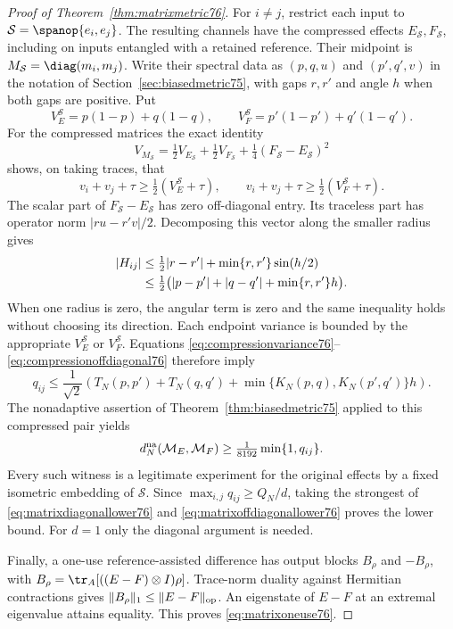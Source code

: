 \begin{proof}[Proof of Theorem~\ref{thm:matrixmetric76}]
For $i\ne j$, restrict each input to
$\mathcal S=\spanop\{e_i,e_j\}$.  The resulting channels have
the compressed effects $E_{\mathcal S},F_{\mathcal S}$, including
on inputs entangled with a retained reference.  Their midpoint is
$M_{\mathcal S}=\diag(m_i,m_j)$.  Write their spectral data as
$(p,q,u)$ and $(p',q',v)$ in the notation of
Section~\ref{sec:biasedmetric75}, with gaps $r,r'$ and angle $h$
when both gaps are positive.  Put
\[
 V_E^{\mathcal S}=p(1-p)+q(1-q),\qquad
 V_F^{\mathcal S}=p'(1-p')+q'(1-q').
\]
For the compressed matrices the exact identity
\[
 V_{M_{\mathcal S}}=\tfrac12V_{E_{\mathcal S}}
              +\tfrac12V_{F_{\mathcal S}}
              +\tfrac14(F_{\mathcal S}-E_{\mathcal S})^2
\]
shows, on taking traces, that
\begin{equation}\label{eq:compressionvariance76}
 v_i+v_j+\tau\ge\tfrac12(V_E^{\mathcal S}+\tau),
 \qquad
 v_i+v_j+\tau\ge\tfrac12(V_F^{\mathcal S}+\tau).
\end{equation}
The scalar part of $F_{\mathcal S}-E_{\mathcal S}$ has zero
off-diagonal entry.  Its traceless part has operator norm
$|ru-r'v|/2$.  Decomposing this vector along the smaller radius
gives
\begin{align}
 |H_{ij}|&\le\tfrac12|r-r'|+\min\{r,r'\}\sin(h/2)\notag\\
 &\le\tfrac12\bigl(|p-p'|+|q-q'|+\min\{r,r'\}h\bigr).
                                      \label{eq:compressionoffdiagonal76}
\end{align}
When one radius is zero, the angular term is zero and the same
inequality holds without choosing its direction.  Each endpoint
variance is bounded by the appropriate $V_E^{\mathcal S}$ or
$V_F^{\mathcal S}$.  Equations
\eqref{eq:compressionvariance76}--\eqref{eq:compressionoffdiagonal76}
therefore imply
\begin{equation}\label{eq:compressionmodulus76}
 q_{ij}\le\frac1{\sqrt2}
 \left(T_N(p,p')+T_N(q,q')
       +\min\{K_N(p,q),K_N(p',q')\}h\right).
\end{equation}
The nonadaptive assertion of Theorem~\ref{thm:biasedmetric75}
applied to this compressed pair yields
\begin{equation}\label{eq:matrixoffdiagonallower76}
 d_N^{\rm na}(\mathcal M_E,\mathcal M_F)
                         \ge\tfrac1{8192}\min\{1,q_{ij}\}.
\end{equation}
Every such witness is a legitimate experiment for the original
effects by a fixed isometric embedding of $\mathcal S$.
Since $\max_{i,j}q_{ij}\ge Q_N/d$, taking the strongest of
\eqref{eq:matrixdiagonallower76} and
\eqref{eq:matrixoffdiagonallower76} proves the lower bound.
For $d=1$ only the diagonal argument is needed.

Finally, a one-use reference-assisted difference has output blocks
$B_\rho$ and $-B_\rho$, with
$B_\rho=\tr_A[((E-F)\otimes I)\rho]$.  Trace-norm duality
against Hermitian contractions gives
$\|B_\rho\|_1\le\|E-F\|_{\rm op}$.  An eigenstate of
$E-F$ at an extremal eigenvalue attains equality.  This proves
\eqref{eq:matrixoneuse76}.
\end{proof}

